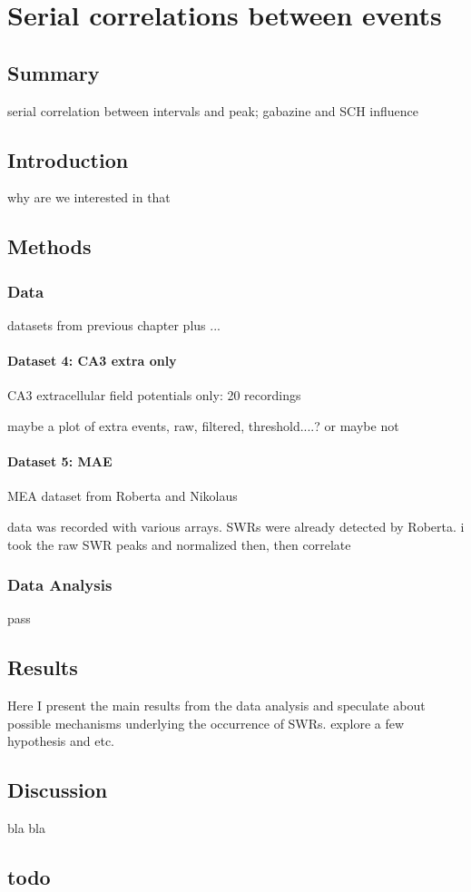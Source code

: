\chapter{Serial correlations between events}

\section{Summary}
  serial correlation between intervals and peak; gabazine and SCH influence
\section{Introduction}
  why are we interested in that 
\section{Methods}
  \subsection{Data}
  datasets from previous chapter plus ...
    \subsubsection{Dataset 4: CA3 extra only}
      CA3 extracellular field potentials only: 20 recordings

      maybe a plot of extra events, raw, filtered, threshold....? or maybe not


    \subsubsection{Dataset 5: MAE}
      MEA dataset from Roberta and Nikolaus

      data was recorded with various arrays. SWRs were already detected by Roberta.
      i took the raw SWR peaks and normalized then, then correlate
      
  \subsection{Data Analysis}
    pass
\section{Results}
  Here I present the main results from the data analysis and speculate about
  possible mechanisms underlying the occurrence of SWRs. explore a few hypothesis and etc.

\section{Discussion}
  bla bla
\section{todo}






